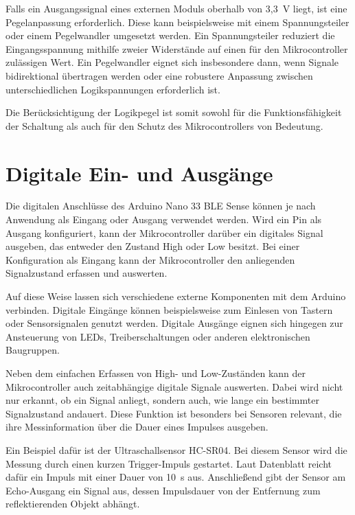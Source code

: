 Falls ein Ausgangssignal eines externen Moduls oberhalb von 3,3~V liegt, ist eine Pegelanpassung erforderlich. Diese kann beispielsweise mit einem Spannungsteiler oder einem Pegelwandler umgesetzt werden. Ein Spannungsteiler reduziert die Eingangsspannung mithilfe zweier Widerstände auf einen für den Mikrocontroller zulässigen Wert. Ein Pegelwandler eignet sich insbesondere dann, wenn Signale bidirektional übertragen werden oder eine robustere Anpassung zwischen unterschiedlichen Logikspannungen erforderlich ist\cite{Jimblom:2026}.

Die Berücksichtigung der Logikpegel ist somit sowohl für die Funktionsfähigkeit der Schaltung als auch für den Schutz des Mikrocontrollers von Bedeutung. 

\section{Digitale Ein- und Ausgänge}

Die digitalen Anschlüsse des Arduino Nano 33 BLE Sense können je nach Anwendung als Eingang oder Ausgang verwendet werden. Wird ein Pin als Ausgang konfiguriert, kann der Mikrocontroller darüber ein digitales Signal ausgeben, das entweder den Zustand High oder Low besitzt. Bei einer Konfiguration als Eingang kann der Mikrocontroller den anliegenden Signalzustand erfassen und auswerten.\cite{ArduinoDP:2026}

Auf diese Weise lassen sich verschiedene externe Komponenten mit dem Arduino verbinden. Digitale Eingänge können beispielsweise zum Einlesen von Tastern oder Sensorsignalen genutzt werden. Digitale Ausgänge eignen sich hingegen zur Ansteuerung von LEDs, Treiberschaltungen oder anderen elektronischen Baugruppen\cite{ArduinoDP:2026}.

Neben dem einfachen Erfassen von High- und Low-Zuständen kann der Mikrocontroller auch zeitabhängige digitale Signale auswerten. Dabei wird nicht nur erkannt, ob ein Signal anliegt, sondern auch, wie lange ein bestimmter Signalzustand andauert. Diese Funktion ist besonders bei Sensoren relevant, die ihre Messinformation über die Dauer eines Impulses ausgeben\cite{ArduinoDP:2026}.

Ein Beispiel dafür ist der Ultraschallsensor HC-SR04. Bei diesem Sensor wird die Messung durch einen kurzen Trigger-Impuls gestartet. Laut Datenblatt reicht dafür ein Impuls mit einer Dauer von 10~\textmu s aus. Anschlie\ss end gibt der Sensor am Echo-Ausgang ein Signal aus, dessen Impulsdauer von der Entfernung zum reflektierenden Objekt abhängt.



